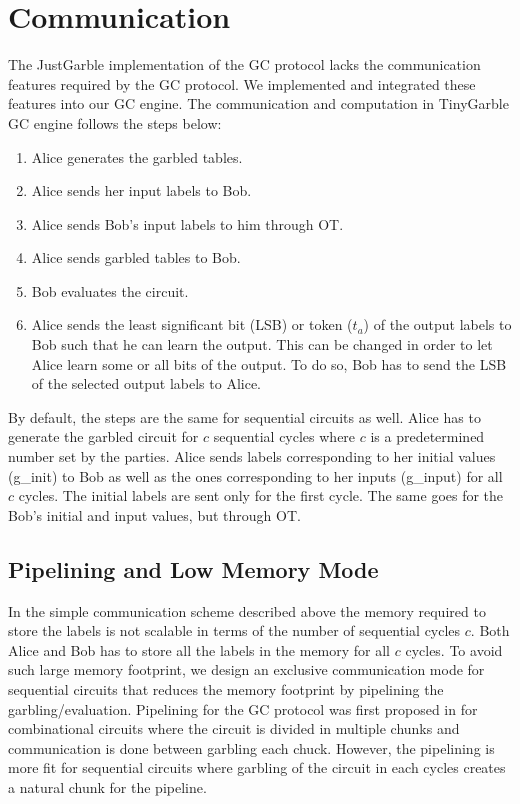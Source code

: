 \section{Communication}\label{ssec:engine-comm}
The JustGarble implementation of the GC protocol lacks the communication features required by the GC protocol.
We implemented and integrated these features into our GC engine.
The communication and computation in TinyGarble GC engine follows the steps below:
\begin{enumerate}
\item Alice generates the garbled tables.
\item Alice sends her input labels to Bob.
\item Alice sends Bob's input labels to him through OT.
\item Alice sends garbled tables to Bob.
\item Bob evaluates the circuit.
\item Alice sends the least significant bit (LSB) or token (${t}_a$) of the output labels to Bob such that he can learn the output.
  This can be changed in order to let Alice learn some or all bits of the output.
  To do so, Bob has to send the LSB of the selected output labels to Alice.
\end{enumerate}

By default, the steps are the same for sequential circuits as well.
Alice has to generate the garbled circuit for $c$ sequential cycles where $c$ is a predetermined number set by the parties.
Alice sends labels corresponding to her initial values (g\_init) to Bob as well as the ones corresponding to her inputs (g\_input) for all $c$ cycles.
The initial labels are sent only for the first cycle.
The same goes for the Bob's initial and input values, but through OT.

\subsection{Pipelining and Low Memory Mode}
In the simple communication scheme described above the memory required to store the labels is not scalable in terms of the number of sequential cycles $c$.
Both Alice and Bob has to store all the labels in the memory for all $c$ cycles.
To avoid such large memory footprint, we design an exclusive communication mode for sequential circuits that reduces the memory footprint by pipelining the garbling/evaluation.
Pipelining for the GC protocol was first proposed in \cite{husted2013gpu} for combinational circuits where the circuit is divided in multiple chunks and communication is done between garbling each chuck.
However, the pipelining is more fit for sequential circuits where garbling of the circuit in each cycles creates a natural chunk for the pipeline.

